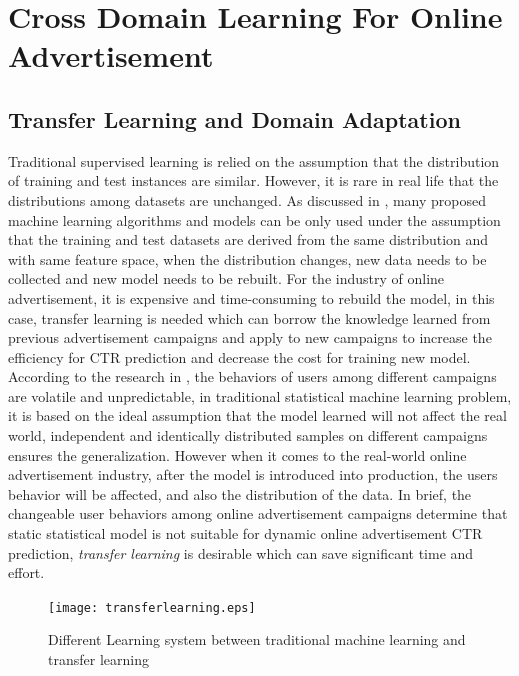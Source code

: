\chapter{Cross Domain Learning For Online Advertisement}
\label{chapterlabel5}
\section{Transfer Learning and Domain Adaptation}
Traditional supervised learning is relied on the assumption that the distribution of training and test instances are similar. However, it is rare in real life that the distributions among datasets are unchanged. As discussed in \cite{facebook2015}, many proposed machine learning algorithms and models can be only used under the assumption that the training and test datasets are derived from the same distribution and with same feature space, when the distribution changes, new data needs to be collected and new model needs to be rebuilt. For the industry of online advertisement, it is expensive and time-consuming to rebuild the model, in this case, transfer learning is needed which can borrow the knowledge learned from previous advertisement campaigns and apply to new campaigns to increase the efficiency for CTR prediction and decrease the cost for training new model. According to the research in \cite{pan2008transfer}, the behaviors of users among different campaigns are volatile and unpredictable, in traditional statistical machine learning problem, it is based on the ideal assumption that the model learned will not affect the real world, independent and identically distributed samples on different campaigns ensures the generalization. However when it comes to the real-world online advertisement industry, after the model is introduced into production, the users behavior will be affected, and also the distribution of the data. In brief, the changeable user behaviors among online advertisement campaigns determine that static statistical model is not suitable for dynamic online advertisement CTR prediction, \textit{transfer learning} is desirable which can save significant time and effort. 

\begin{figure}[t]
\centering
\texttt{[image: transferlearning.eps]}
\caption{Different Learning system between traditional machine learning and transfer learning}
\label{fig:transfer}
\end{figure}


